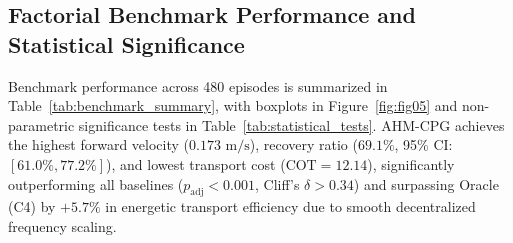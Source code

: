 \documentclass{iopjournal}
\begin{document}
\begin{table}[htbp]
\centering
\caption{Adaptation Latency $T_{\text{adapt}}$ (s, mean $\pm$ std, 10 seeds) across Fault Types.}
\label{tab:adaptation_latency}
\end{table}

\subsection{Factorial Benchmark Performance and Statistical Significance}
Benchmark performance across 480 episodes is summarized in Table~\ref{tab:benchmark_summary}, with boxplots in Figure~\ref{fig:fig05} and non-parametric significance tests in Table~\ref{tab:statistical_tests}. AHM-CPG achieves the highest forward velocity ($0.173\text{ m/s}$), recovery ratio ($69.1\%$, 95\% CI: $[61.0\%, 77.2\%]$), and lowest transport cost ($\text{COT} = 12.14$), significantly outperforming all baselines ($p_{\text{adj}} < 0.001$, Cliff's $\delta > 0.34$) and surpassing Oracle (C4) by $+5.7\%$ in energetic transport efficiency due to smooth decentralized frequency scaling.
\end{document}
